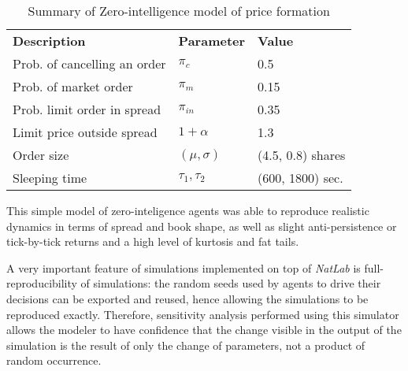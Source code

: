 \begin{table}[htbp]
\begin{center}
\begin{tabular}{ l l l }
\textbf{Description} & \textbf{Parameter} & \textbf{Value} \\
\cmidrule(r){1-3}
Prob. of cancelling an order & $\pi_c$    		& 0.5                \\
Prob. of market order		 & $\pi_m$   		& 0.15               \\
Prob. limit order in spread  & $\pi_{in}$ 		& 0.35               \\ 
Limit price outside spread   & $1+\alpha$ 		& 1.3                \\
Order size					 & $(\mu, \sigma)$	& (4.5, 0.8) shares  \\
Sleeping time				 & $\tau_1, \tau_2$ & (600, 1800) sec.   \\
\end{tabular}
\end{center}
\caption{Summary of Zero-intelligence model of price formation}
\label{Table/Zero-Intelligence}
\end{table}

This simple model of zero-inteligence agents was able to reproduce realistic dynamics in terms of spread and book shape, as well as slight anti-persistence or tick-by-tick returns and a high level of kurtosis and fat tails. 

A very important feature of simulations implemented on top of \textit{NatLab} is full-reproducibility of simulations: the random seeds used by agents to drive their decisions can be exported and reused, hence allowing the simulations to be reproduced exactly. Therefore, sensitivity analysis performed using this simulator allows the modeler to have confidence that the change visible in the output of the simulation is the result of only the change of parameters, not a product of random occurrence.







   







